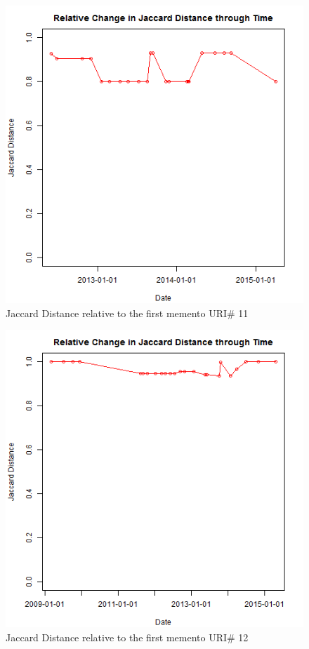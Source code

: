 \begin{figure}[ht]
	\begin{center}
		 \includegraphics[scale=0.60]{url11}
		  \caption{Jaccard Distance relative to the first memento URI\# 11}
	 \end{center}
\end{figure}
\begin{figure}[ht]
	\begin{center}
		 \includegraphics[scale=0.60]{url12}
		  \caption{Jaccard Distance relative to the first memento URI\# 12}
	 \end{center}
\end{figure}

